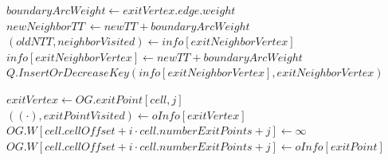 \begin{algorithm}
{\begin{minipage}{\textwidth}
\begin{algorithmic}[1]
                            \State $boundaryArcWeight \gets  exitVertex.edge.weight$ 
                            \State $newNeighborTT \ \gets newTT + boundaryArcWeight $
                            \State $(oldNTT, neighborVisited) \gets info[exitNeighborVertex]$
                                \State $info[exitNeighborVertex] \gets newTT +boundaryArcWeight $
                                \State $Q.InsertOrDecreaseKey(info[exitNeighborVertex], exitNeighborVertex)$
                            \EndIf 
                        \EndIf 
                    \EndIf
                \EndFor 
            \EndWhile 

                \State $exitVertex \gets OG.exitPoint[cell, j]$ 
                \State $((\cdot), exitPointVisited) \gets oInfo[exitVertex]$
                    \State $OG.W[cell.cellOffset + i \cdot cell.numberExitPoints + j]  \gets \infty$
                \Else 
                    \State $OG.W[cell.cellOffset + i \cdot cell.numberExitPoints + j]  \gets oInfo[exitPoint]$
                \EndIf 
            \EndFor 
        \EndFor
    \EndFor 
\EndProcedure
\end{algorithmic}
\end{minipage}%
}
\end{algorithm}


